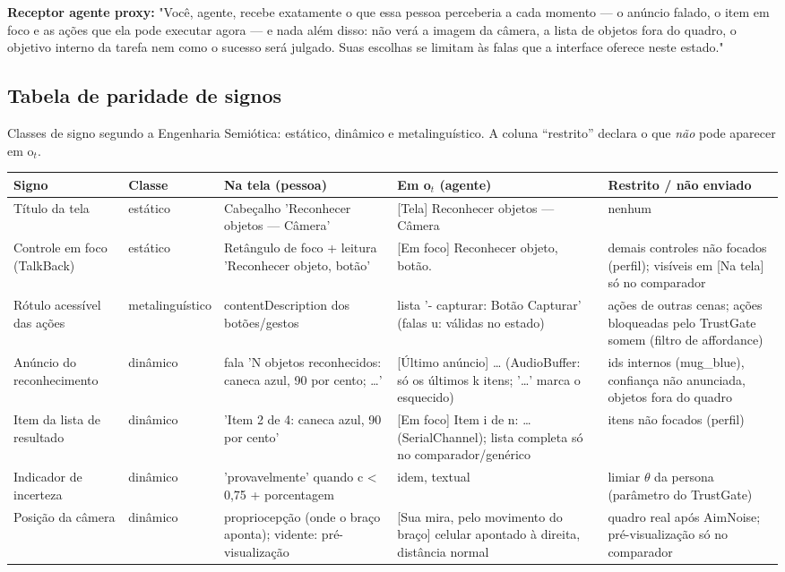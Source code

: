 \documentclass[a4paper,10pt]{article}
\begin{document}
\smallskip\noindent\textbf{Receptor agente proxy:} "Você, agente, recebe exatamente o que essa pessoa perceberia a cada momento — o anúncio falado, o item em foco e as ações que ela pode executar agora — e nada além disso: não verá a imagem da câmera, a lista de objetos fora do quadro, o objetivo interno da tarefa nem como o sucesso será julgado. Suas escolhas se limitam às falas que a interface oferece neste estado."


\subsection{Tabela de paridade de signos}
Classes de signo segundo a Engenharia Semiótica: estático, dinâmico e metalinguístico. A coluna “restrito” declara o que \emph{não} pode aparecer em o$_t$.
\begin{longtable}{L{3cm} L{2.2cm} L{5cm} L{7cm} L{6cm}}
\toprule
Signo & Classe & Na tela (pessoa) & Em o$_t$ (agente) & Restrito / não enviado\\
\midrule\endhead
Título da tela & estático & Cabeçalho 'Reconhecer objetos — Câmera' & [Tela] Reconhecer objetos — Câmera & nenhum\\
\midrule
Controle em foco (TalkBack) & estático & Retângulo de foco + leitura 'Reconhecer objeto, botão' & [Em foco] Reconhecer objeto, botão. & demais controles não focados (perfil); visíveis em [Na tela] só no comparador\\
\midrule
Rótulo acessível das ações & metalinguístico & contentDescription dos botões/gestos & lista '- capturar: Botão Capturar' (falas u: válidas no estado) & ações de outras cenas; ações bloqueadas pelo TrustGate somem (filtro de affordance)\\
\midrule
Anúncio do reconhecimento & dinâmico & fala 'N objetos reconhecidos: caneca azul, 90 por cento; \ldots{}' & [Último anúncio] \ldots{} (AudioBuffer: só os últimos k itens; '\ldots{}' marca o esquecido) & ids internos (mug\_blue), confiança não anunciada, objetos fora do quadro\\
\midrule
Item da lista de resultado & dinâmico & 'Item 2 de 4: caneca azul, 90 por cento' & [Em foco] Item i de n: \ldots{} (SerialChannel); lista completa só no comparador/genérico & itens não focados (perfil)\\
\midrule
Indicador de incerteza & dinâmico & 'provavelmente' quando c < 0,75 + porcentagem & idem, textual & limiar $\theta$ da persona (parâmetro do TrustGate)\\
\midrule
Posição da câmera & dinâmico & propriocepção (onde o braço aponta); vidente: pré-visualização & [Sua mira, pelo movimento do braço] celular apontado à direita, distância normal & quadro real após AimNoise; pré-visualização só no comparador\\

\end{longtable}
\end{document}
